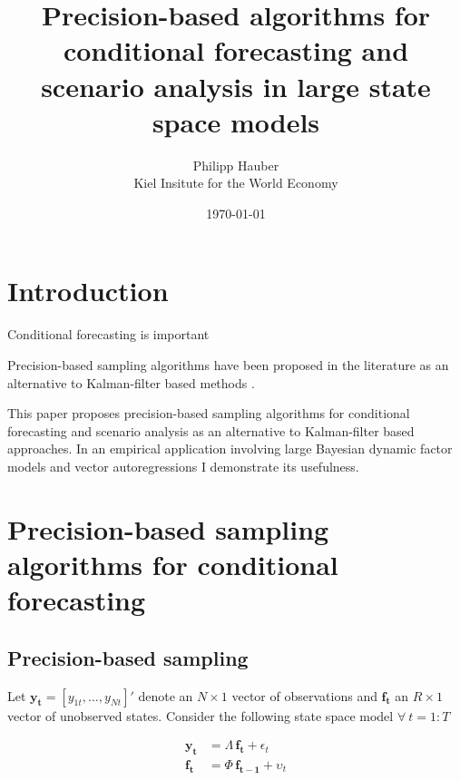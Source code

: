 \documentclass[notitlepage,a4paper,12pt]{article}
\begin{document}
\title{Precision-based algorithms for conditional forecasting and scenario analysis in large state space models}

\author{
  Philipp Hauber\\
  Kiel Insitute for the World Economy
}
\date{\today}

\maketitle

\section{Introduction}

Conditional forecasting is important \citep{bgl_2015ijf}

Precision-based sampling algorithms have been proposed in the literature as an alternative to Kalman-filter based methods \citep{chanjeliazkov_2009}.

This paper proposes precision-based sampling algorithms for conditional forecasting and scenario analysis as an alternative to Kalman-filter based approaches. In an empirical application involving large Bayesian dynamic factor models and vector autoregressions I demonstrate its usefulness. 

\section{Precision-based sampling algorithms for conditional forecasting}

\subsection{Precision-based sampling}

Let $\mathbf{y_t} = [y_{1t}, \dots, y_{Nt}]'$ denote an $N \times 1$ vector of observations and $\mathbf{f_t}$ an $R \times 1$ vector of unobserved states. Consider the following state space model $\forall \: t = 1:T$

\begin{subequations}
    \label{eqn:statespacesys}
    \begin{align}
        \mathbf{y_t} &= \Lambda \, \mathbf{f_t} + \epsilon_t \label{eqn:statespacesys_meas}\\
        \mathbf{f_t} &= \Phi \, \mathbf{f_{t-1}} + \upsilon_t \label{eqn:statespacesys_trans}
    \end{align}
\end{subequations}
\end{document}
